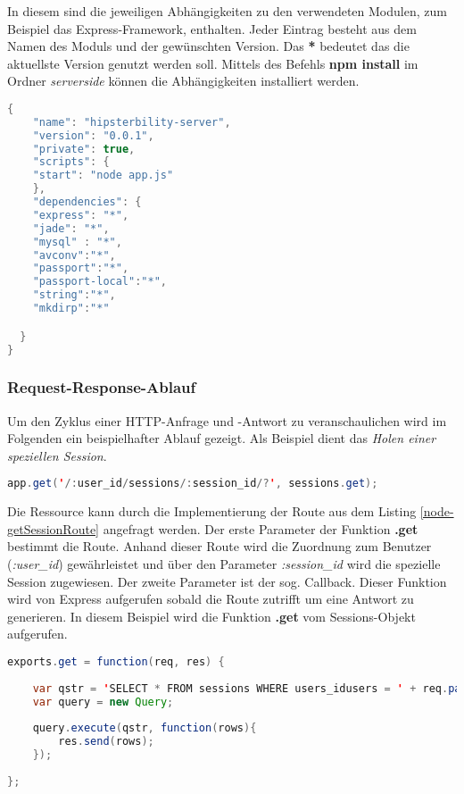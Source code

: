 In diesem sind die jeweiligen Abhängigkeiten zu den verwendeten Modulen, zum Beispiel das Express-Framework, enthalten. Jeder Eintrag besteht aus dem Namen des Moduls und der gewünschten Version. Das \textbf{*} bedeutet das die aktuellste Version genutzt werden soll. Mittels des Befehls \textbf{npm install} im Ordner \textit{serverside} können die Abhängigkeiten installiert werden. 

\begin{lstlisting}[label=node-packages,language=Java, caption=Abhängigkeiten der Node-Anwendung]
{
    "name": "hipsterbility-server",
    "version": "0.0.1",
    "private": true,
    "scripts": {
    "start": "node app.js"
    },
    "dependencies": {
    "express": "*",
	"jade": "*",
	"mysql" : "*",
    "avconv":"*",
    "passport":"*",
    "passport-local":"*",
    "string":"*",
    "mkdirp":"*"

  }
}
\end{lstlisting}

\subsubsection{Request-Response-Ablauf \label{sec:req-res-cycle}}

Um den Zyklus einer HTTP-Anfrage und -Antwort zu veranschaulichen wird im Folgenden ein beispielhafter Ablauf gezeigt. Als Beispiel dient das \emph{Holen einer speziellen Session}.  

\begin{lstlisting}[label=node-getSessionRoute,language=Java, caption=Routenlistener für eine spezielle Session, firstnumber=169] 
app.get('/:user_id/sessions/:session_id/?', sessions.get);
\end{lstlisting}

Die Ressource kann durch die Implementierung der Route aus dem Listing \ref{node-getSessionRoute} angefragt werden. Der erste Parameter der Funktion \textbf{.get} bestimmt die Route. Anhand dieser Route wird die Zuordnung zum Benutzer (\emph{:user\_id}) gewährleistet und über den Parameter \emph{:session\_id} wird die spezielle Session zugewiesen. Der zweite Parameter ist der sog. Callback. Dieser Funktion wird von Express aufgerufen sobald die Route zutrifft um eine Antwort zu generieren. In diesem Beispiel wird die Funktion \textbf{.get} vom Sessions-Objekt aufgerufen.

\begin{lstlisting}[label=node-getSessionHandler,language=Java, caption=Routenbehandlung für eine spezielle Session, firstnumber=29]
exports.get = function(req, res) {
	
	var qstr = 'SELECT * FROM sessions WHERE users_idusers = ' + req.params.user_id + ' AND idsessions = ' + req.params.session_id;
	var query = new Query;
	
	query.execute(qstr, function(rows){
		res.send(rows);
	});
	
};
\end{lstlisting}

